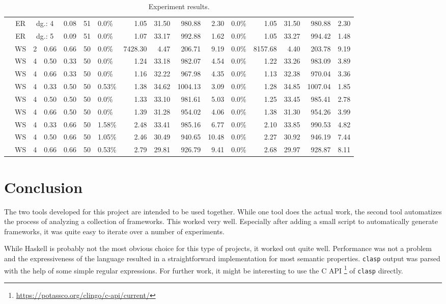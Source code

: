 \documentclass[parskip=half]{scrartcl}
\begin{document}
\begin{sidewaystable}[h!]
\begin{tabular}[h]{|c|c|r|l|l|l|l|r|r|r|r|l|r|r|r|r|}
& ER & \multicolumn{2}{|c|}{dg.: 4} & 0.08 & 51 & 0.0\% & 1.05 & 31.50 & 980.88 & 2.30 & 0.0\%  & 1.05 & 31.50 & 980.88 & 2.30\\
& ER & \multicolumn{2}{|c|}{dg.: 5} & 0.09 & 51 & 0.0\% & 1.07 & 33.17 & 992.88 & 1.62 & 0.0\%  & 1.05 & 33.27 & 994.42 & 1.48\\
\cline{2-16}
& WS & 2 & 0.66 & 0.66 & 50 &  0.0\% & 7428.30 & 4.47 & 206.71 & 9.19 & 0.0\%  & 8157.68 & 4.40 & 203.78 & 9.19\\
& WS & 4 & 0.50 & 0.33 & 50 &  0.0\% & 1.24 & 33.18 & 982.07 & 4.54 & 0.0\%  & 1.22 & 33.26 & 983.09 & 3.89\\
& WS & 4 & 0.66 & 0.33 & 50 &  0.0\% & 1.16 & 32.22 & 967.98 & 4.35 & 0.0\%  & 1.13 & 32.38 & 970.04 & 3.36\\
& WS & 4 & 0.33 & 0.50 & 50 & 0.53\% & 1.38 & 34.62 & 1004.13 & 3.09 & 0.0\% & 1.28 & 34.85 & 1007.04 & 1.85\\
& WS & 4 & 0.50 & 0.50 & 50 &  0.0\% & 1.33 & 33.10 & 981.61 & 5.03 & 0.0\%  & 1.25 & 33.45 & 985.41 & 2.78\\
& WS & 4 & 0.66 & 0.50 & 50 &  0.0\% & 1.39 & 31.28 & 954.02 & 4.06 & 0.0\%  & 1.38 & 31.30 & 954.26 & 3.99\\
& WS & 4 & 0.33 & 0.66 & 50 & 1.58\% & 2.48 & 33.41 & 985.16 & 6.77 & 0.0\%  & 2.10 & 33.85 & 990.53 & 4.82\\
& WS & 4 & 0.50 & 0.66 & 50 & 1.05\% & 2.46 & 30.49 & 940.65 & 10.48 & 0.0\% & 2.27 & 30.92 & 946.19 & 7.44\\
& WS & 4 & 0.66 & 0.66 & 50 & 0.53\% & 2.79 & 29.81 & 926.79 & 9.41 & 0.0\%  & 2.68 & 29.97 & 928.87 & 8.11\\
\hline
\end{tabular}
\caption{\label{tbl_res}Experiment results.}
\end{sidewaystable}

\section{Conclusion}
\label{conclusion}
The two tools developed for this project are intended to be used together.
While one tool does the actual work, the second tool automatizes the process of
analyzing a collection of frameworks. This worked very well.  Especially after
adding a small script to automatically generate frameworks, it was quite easy to
iterate over a number of experiments.

While Haskell is probably not the most obvious choice for this type of projects,
it worked out quite well. Performance was not a problem and the expressiveness
of the language resulted in a straightforward implementation for most semantic
properties. \texttt{clasp} output was parsed with the help of some simple
regular expressions.  For further work, it might be interesting to use the C API
\footnote{\url{https://potassco.org/clingo/c-api/current/}} of \texttt{clasp}
directly.

\printbibliography
\end{document}
